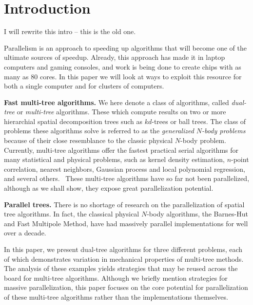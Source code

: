 \documentclass[times, 10pt,twocolumn]{article}
\begin{document}
\section{Introduction}

I will rewrite this intro -- this is the old one.

Parallelism is an approach to speeding up algorithms that will become one of the ultimate sources of speedup.
Already, this approach has made it in laptop computers and gaming consoles, and work is being done to create chips with as many as 80 cores.
In this paper we will look at ways to exploit this resource for both a single computer and for clusters of computers.

{\bf Fast multi-tree algorithms.}
We here denote a class of algorithms, called \emph{dual-tree} or \emph{multi-tree} algorithms.
These which compute results on two or more hierarchial spatial decomposition trees such as $kd$-trees or ball trees.
The class of problems these algorithms solve is referred to as the \emph{generalized $N$-body problems} because of their close resemblance to the classic physical $N$-body problem\cite{gray_nbody}.
Currently, multi-tree algorithms offer the fastest practical serial algorithms for many statistical and physical problems, such as kernel density estimation, $n$-point correlation, nearest neighbors, Gaussian process and local polynomial regression, and several others.\
These multi-tree algorithms have so far not been parallelized, although as we shall show, they expose great parallelization potential.

{\bf Parallel trees.} There is no shortage of research on the parallelization of spatial tree
algorithms.
In fact, the classical physical $N$-body algorithms, the Barnes-Hut\cite{barnes_hut} and Fast Multipole Method\cite{greengard_fmm}, have had massively parallel implementations for well over a decade\cite{singh_loadbal, grama_para_bh, amor_para_bh}.

In this paper, we present dual-tree algorithms for three different problems, each of which demonstrates variation in mechanical properties of multi-tree methods.
The analysis of these examples yields strategies that may be reused across the board for multi-tree algorithms.
Although we briefly mention strategies for massive parallelization, this paper focuses on the core potential for parallelization of these multi-tree algorithms rather than the implementations themselves.

%
%
%
%
%
%
%
%
%
%
\end{document}
